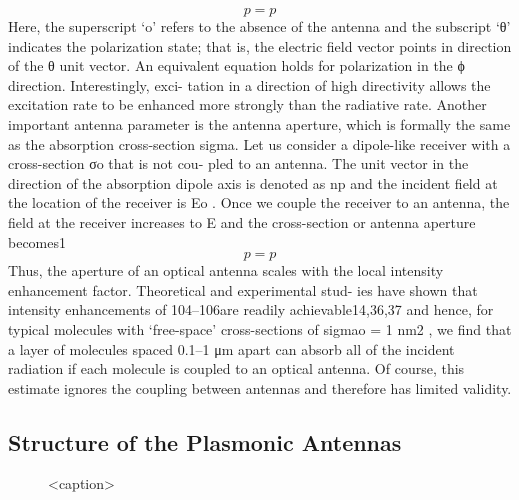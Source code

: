 	\begin{equation}
		p=p
	\end{equation}
	Here, the superscript ‘o’ refers to the absence of the antenna and the subscript ‘θ’ indicates the polarization state; that is, the electric field vector points in direction of the θ unit vector. An equivalent equation holds for polarization in the ϕ direction. Interestingly, exci- tation in a direction of high directivity allows the excitation rate to be enhanced more strongly than the radiative rate. Another important antenna parameter is the antenna aperture, which is formally the same as the absorption cross-section sigma. Let us consider a dipole-like receiver with a cross-section σo that is not cou- pled to an antenna. The unit vector in the direction of the absorption dipole axis is denoted as np and the incident field at the location of the receiver is Eo . Once we couple the receiver to an antenna, the field at the receiver increases to E and the cross-section or antenna aperture becomes1
	\begin{equation}
		p=p
	\end{equation}
	Thus, the aperture of an optical antenna scales with the local intensity enhancement factor. Theoretical and experimental stud- ies have shown that intensity enhancements of 104–106are readily achievable14,36,37 and hence, for typical molecules with ‘free-space’ cross-sections of sigmao = 1 nm2 , we find that a layer of molecules spaced 0.1–1 μm apart can absorb all of the incident radiation if each molecule is coupled to an optical antenna. Of course, this estimate ignores the coupling between antennas and therefore has limited validity.


	\subsection{Structure of the Plasmonic Antennas} \label{sec::structure_antenna}

	\begin{figure}[tp]
		\centering
		\caption{<caption>}
		\label{fig::place_antenna_sem}
	\end{figure}

